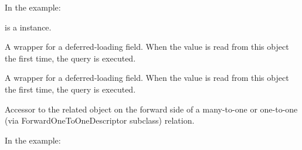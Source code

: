 \documentclass[letterpaper,10pt,english]{sphinxmanual}
\begin{document}
\begin{fulllineitems}
\begin{fulllineitems}
In the example:

%
\begin{sphinxVerbatim}[commandchars=\\\{\}]
 
       
\end{sphinxVerbatim}

 is a  instance.

\end{fulllineitems}


\begin{fulllineitems}
\label{\detokenize{QuChemPedIA.models:QuChemPedIA.models.ImportRuleModel.ImportRule.id_job_type_id}}
A wrapper for a deferred-loading field. When the value is read from this
object the first time, the query is executed.

\end{fulllineitems}


\begin{fulllineitems}
\label{\detokenize{QuChemPedIA.models:QuChemPedIA.models.ImportRuleModel.ImportRule.id_rule}}
A wrapper for a deferred-loading field. When the value is read from this
object the first time, the query is executed.

\end{fulllineitems}


\begin{fulllineitems}
\label{\detokenize{QuChemPedIA.models:QuChemPedIA.models.ImportRuleModel.ImportRule.id_software}}
Accessor to the related object on the forward side of a many-to-one or
one-to-one (via ForwardOneToOneDescriptor subclass) relation.

In the example:


\end{fulllineitems}
\end{fulllineitems}
\end{document}
